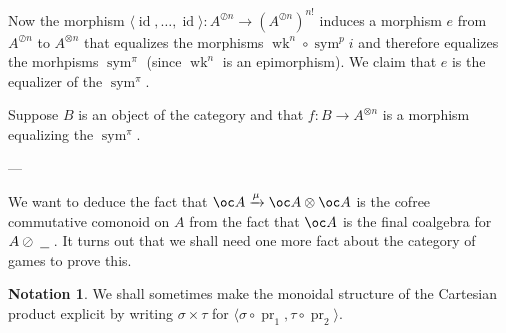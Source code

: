 \documentclass[a4paper,UKenglish]{lipics-v2016}
\theoremstyle{plain}
\theoremstyle{definition}
\newtheorem{notation}[theorem]{Notation}
\newcommand*\from{\colon}
\DeclareMathOperator{\id}{id}
\DeclareMathOperator{\pr}{pr}
\newcommand{\tensor}{\otimes}
\newcommand{\sequoid}{\oslash}
\newcommand{\comp}[2]{#1 \circ #2}
\DeclareMathOperator{\sym}{sym}
\newcommand{\blank}{\;\underline{\hspace{1.5ex}}\;}
\DeclareMathOperator{\wk}{wk}
\newlength{\arrow}
\begin{document}
Now the morphism $\langle\id,\dots,\id\rangle\from A^{\sequoid n}\to (A^{\sequoid n})^{n!}$ induces a morphism $e$ from $A^{\sequoid n}$ to $A^{\tensor n}$ that equalizes the morphisms $\comp{\wk^n}{\sym^pi}$ and therefore equalizes the morhpisms $\sym^\pi$ (since $\wk^n$ is an epimorphism).  We claim that $e$ is the equalizer of the $\sym^\pi$.  

Suppose $B$ is an object of the category and that $f\from B\to A^{\tensor n}$ is a morphism equalizing the $\sym^\pi$.  

---

We want to deduce the fact that $\oc A\xrightarrow{\mu}\oc A\tensor\oc A$ is the cofree commutative comonoid on $A$ from the fact that $\oc A$ is the final coalgebra for $A\sequoid\blank$.  It turns out that we shall need one more fact about the category of games to prove this.

\begin{notation}
  We shall sometimes make the monoidal structure of the Cartesian product explicit by writing $\sigma\times\tau$ for $\langle\comp\sigma{\pr_1},\comp\tau{\pr_2}\rangle$.
\end{notation}
\end{document}
